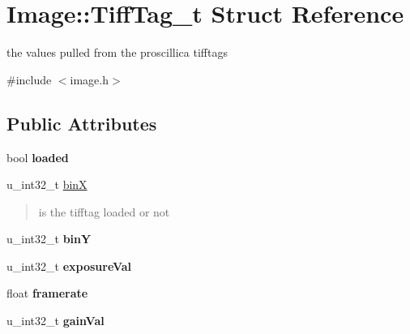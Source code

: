 \hypertarget{structImage_1_1TiffTag__t}{}\section{Image\+:\+:Tiff\+Tag\+\_\+t Struct Reference}
\label{structImage_1_1TiffTag__t}


the values pulled from the proscillica tifftags  




{\ttfamily \#include $<$image.\+h$>$}

\subsection*{Public Attributes}
\begin{DoxyCompactItemize}
\item 
bool {\bfseries loaded}\hypertarget{structImage_1_1TiffTag__t_af644ab9fa1970f905f1707e051d6a31e}{}\label{structImage_1_1TiffTag__t_af644ab9fa1970f905f1707e051d6a31e}

\item 
u\+\_\+int32\+\_\+t \hyperlink{structImage_1_1TiffTag__t_a533ec10679577c6e0e66de2e54fc33d7}{binX}\hypertarget{structImage_1_1TiffTag__t_a533ec10679577c6e0e66de2e54fc33d7}{}\label{structImage_1_1TiffTag__t_a533ec10679577c6e0e66de2e54fc33d7}

\begin{DoxyCompactList}\small\item\em \begin{quote}
is the tifftag loaded or not \end{quote}
\end{DoxyCompactList}\item 
u\+\_\+int32\+\_\+t {\bfseries binY}\hypertarget{structImage_1_1TiffTag__t_aaec5611976f0f50f95b5163363263030}{}\label{structImage_1_1TiffTag__t_aaec5611976f0f50f95b5163363263030}

\item 
u\+\_\+int32\+\_\+t {\bfseries exposure\+Val}\hypertarget{structImage_1_1TiffTag__t_a2148d5d7a7e120a615b1dcce5963da92}{}\label{structImage_1_1TiffTag__t_a2148d5d7a7e120a615b1dcce5963da92}

\item 
float {\bfseries framerate}\hypertarget{structImage_1_1TiffTag__t_a106e10866bd8bbd25e2cf2f80d0b8a6a}{}\label{structImage_1_1TiffTag__t_a106e10866bd8bbd25e2cf2f80d0b8a6a}

\item 
u\+\_\+int32\+\_\+t {\bfseries gain\+Val}\hypertarget{structImage_1_1TiffTag__t_a5960e5cec25ef827ad5d02f78c4d397e}{}\label{structImage_1_1TiffTag__t_a5960e5cec25ef827ad5d02f78c4d397e}


\end{DoxyCompactItemize}
